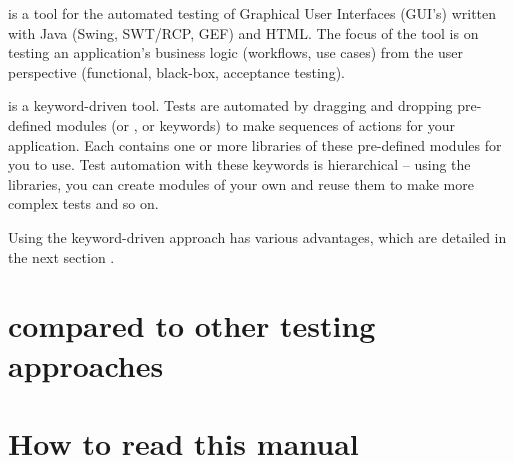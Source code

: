 
\jb{} is a tool for the automated testing of Graphical User Interfaces (GUI's) written with Java (Swing, SWT/RCP, GEF) and HTML. The focus of the tool is on testing an application's business logic (workflows, use cases)  from the user perspective (functional, black-box, acceptance testing).
 
\jb{} is a keyword-driven tool. Tests are automated by dragging and dropping pre-defined modules (or \gdcases{}, or keywords) to make sequences of actions for your application. Each \jb{} \gdproject{}  contains one or more libraries of these pre-defined modules for you to use. Test automation with these keywords is hierarchical -- using the libraries, you can create modules of your own and reuse them to make more complex tests and so on. 

Using the keyword-driven approach has various advantages, which are detailed in the next section . 

\section{\jb{} compared to other testing approaches}

\clearpage

\section{How to read this manual}

\clearpage




